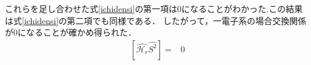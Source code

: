 \documentclass{article}
\begin{document}
これらを足し合わせた式\eqref{ichidensi}の第一項は0になることがわかった.この結果は式\eqref{ichidensi}の第二項でも同様である．
したがって，一電子系の場合交換関係が0になることが確かめ得られた．
\begin{equation}
\begin{split}
\label{}
[\hat{\mathcal{H}_r} \hat{S^2} ] =&0
\end{split}
\end{equation}



    
\end{document}

